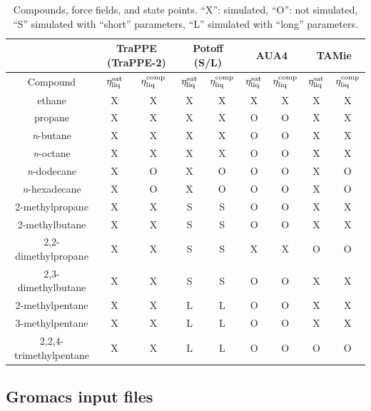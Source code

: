 \documentclass[preprint,review,12pt]{elsarticle}
\begin{document}
	\begin{table}[h!]
		\caption{Compounds, force fields, and state points. ``X'': simulated, ``O'': not simulated, ``S'' simulated with ``short'' parameters, ``L'' simulated with ``long'' parameters.} \label{tab:simulations_performed}
		\begin{center}
			\begin{tabular}{|c|c|c|c|c|c|c|c|c|}
				\hline
				\multicolumn{1}{|c}{} & \multicolumn{2}{|c}{TraPPE (TraPPE-2)} & \multicolumn{2}{|c|}{Potoff (S/L)} & \multicolumn{2}{|c}{AUA4} & \multicolumn{2}{|c|}{TAMie}  \\ \hline
				Compound & $\eta_{\rm liq}^{\rm sat}$ & $\eta_{\rm liq}^{\rm comp}$ & $\eta_{\rm liq}^{\rm sat}$ & $\eta_{\rm liq}^{\rm comp}$ & $\eta_{\rm liq}^{\rm sat}$ & $\eta_{\rm liq}^{\rm comp}$ & $\eta_{\rm liq}^{\rm sat}$ & $\eta_{\rm liq}^{\rm comp}$ \\ \hline
				ethane & X & X & X & X & X & X & X & X \\ \hline
				propane & X & X & X & X & O & O & X & X \\ \hline
				\textit{n}-butane & X & X & X & X & O & O & X & X \\ \hline
				\textit{n}-octane & X & X & X & X & O & O & X & X \\ \hline
				\textit{n}-dodecane & X & O & X & O & O & O & X & O \\ \hline
				\textit{n}-hexadecane & X & O & X & O & O & O & X & O \\ \hline
				2-methylpropane & X & X & S & S & O & O & X & X \\ \hline
				2-methylbutane & X & X & S & S & O & O & X & X \\ \hline
				2,2-dimethylpropane & X & X & S & S & X & X & O & O \\ \hline
				2,3-dimethylbutane & X & X & S & S & O & O & X & X \\ \hline
				2-methylpentane & X & X & L & L & O & O & X & X \\ \hline
				3-methylpentane & X & X & L & L & O & O & X & X \\ \hline
				2,2,4-trimethylpentane & X & X & L & L & O & O & O & O \\ \hline
			\end{tabular}
		\end{center} 
	\end{table}
		
	\subsection{Gromacs input files}
	
\end{document}
